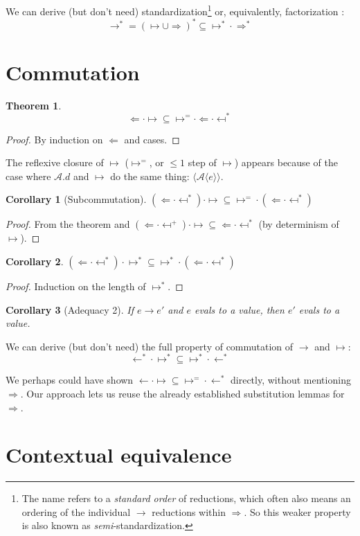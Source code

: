 \documentclass[a4paper, 11pt,titlepage, openright, twoside]{report}
\newcommand{\Int}{\Rightarrow}
\newcommand{\Tni}{\Leftarrow}
\newcommand{\A}{\mathcal{A}}
\newcommand{\+}{\enspace}
\newtheorem{corollary}{Corollary}
\newtheorem{theorem}{Theorem}
\begin{document}
We can derive (but don't need) standardization\footnote{
	The name refers to a \textit{standard order} of reductions,
	which often also means an ordering of the individual $→$ reductions within $\Int$.
	So this weaker property is also known as \textit{semi}-standardization.
} or, equivalently, factorization \cite{factorize}:
$$→^* = (↦ ∪ \Int)^* ⊆ {↦^* · \Int^*}$$

\section{Commutation}

\begin{theorem}
 \label{quasisubcomm}
	$${\Tni · ↦ } ⊆ {↦^= · \Tni · \mapsfrom^*}$$
\end{theorem}
\begin{proof}
	By induction on $\Tni$ and cases.
\end{proof}
The reflexive closure of $↦$ ($↦^=$, or $≤1$ step of $↦$) appears because of the case
where $\A.d$ and $↦$ do the same thing: $⟨\A⟨e⟩⟩$.

\begin{corollary}[Subcommutation]
	${(\Tni · \mapsfrom^*) · ↦} ⊆ {↦^= \mathbin{·} ({{\Tni} · \mapsfrom^*})}$
\end{corollary}
\begin{proof}
	From the theorem %
	and
	${(\Tni · \mapsfrom^+) · ↦} ⊆ {{{\Tni} · \mapsfrom^*}}$ (by determinism of $↦$).
\end{proof}
\begin{corollary}
	${(\Tni · \mapsfrom^*) · ↦^*} ⊆ {↦^* \mathbin{·} ({{\Tni} · \mapsfrom^*})}$
\end{corollary}
\begin{proof}
	Induction on the length of $↦^*$.
\end{proof}
\begin{corollary}[Adequacy 2]
	If $e → e'$ and $e$ evals to a value, then $e'$ evals to a value.
\end{corollary}

We can derive (but don't need) the full property of commutation of $→$ and $↦$:
$${←^* · ↦^*} ⊆ {↦^* · ←^*}$$

We perhaps could have shown ${← · ↦} ⊆ {↦^= · ←^*}$ directly, without mentioning $\Int$.
Our approach lets us reuse the already established substitution lemmas for $\Int$.

\section{Contextual equivalence}
\end{document}
